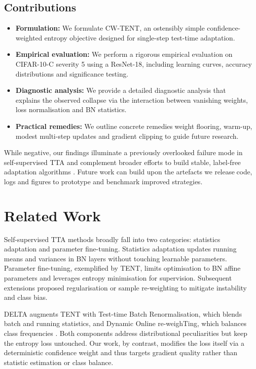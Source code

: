 \documentclass{article} %
\begin{document}
\subsection{Contributions}
\begin{itemize}
  \item \textbf{Formulation:} We formulate CW-TENT, an ostensibly simple confidence-weighted entropy objective designed for single-step test-time adaptation.
  \item \textbf{Empirical evaluation:} We perform a rigorous empirical evaluation on CIFAR-10-C severity 5 using a ResNet-18, including learning curves, accuracy distributions and significance testing.
  \item \textbf{Diagnostic analysis:} We provide a detailed diagnostic analysis that explains the observed collapse via the interaction between vanishing weights, loss normalisation and BN statistics.
  \item \textbf{Practical remedies:} We outline concrete remediesweight flooring, warm-up, modest multi-step updates and gradient clippingto guide future research.
\end{itemize}

While negative, our findings illuminate a previously overlooked failure mode in self-supervised TTA and complement broader efforts to build stable, label-free adaptation algorithms \cite{zhao-2023-delta,author-year-test}. Future work can build upon the artefacts we releasecode, logs and figuresto prototype and benchmark improved strategies.

\section{Related Work}
\label{sec:related}
Self-supervised TTA methods broadly fall into two categories: statistics adaptation and parameter fine-tuning. Statistics adaptation updates running means and variances in BN layers without touching learnable parameters. Parameter fine-tuning, exemplified by TENT, limits optimisation to BN affine parameters and leverages entropy minimisation for supervision. Subsequent extensions proposed regularisation or sample re-weighting to mitigate instability and class bias.

DELTA augments TENT with Test-time Batch Renormalisation, which blends batch and running statistics, and Dynamic Online re-weighTing, which balances class frequencies \cite{zhao-2023-delta}. Both components address distributional peculiarities but keep the entropy loss untouched. Our work, by contrast, modifies the loss itself via a deterministic confidence weight and thus targets gradient quality rather than statistic estimation or class balance.
\end{document}
